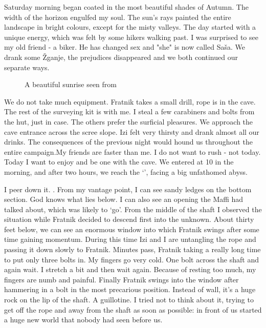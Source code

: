 Saturday morning began coated in the most beautiful shades of Autumn. The width of the horizon engulfed my soul. The sun's rays painted the entire landscape in bright colours, except for the misty valleys. The day started with a unique energy, which was felt by some hikers walking past. I was surprised to see my old friend - a biker. He has changed sex and "she" is now called Saša. We drank some Žganje, the prejudices disappeared and we  both continued our separate ways. 


 \begin{figure}[t!]
\checkoddpage \ifoddpage \forcerectofloat \else \forceversofloat \fi
\centering
{}
\caption{A beautiful sunrise seen from \protect{} }
\label{mig seen from kuk}
\end{figure}


We do not take much equipment. Fratnik takes a small drill, rope is in the cave. The rest of the surveying kit is with me. I steal a few carabiners and bolts from the hut, just in case. The others prefer the surficial pleasures. We approach the cave entrance across the scree slope. Izi felt very thirsty and drank almost all our drinks.  The consequences of the previous night would hound us throughout the entire campaign.My friends are faster than me. I do not want to rush  - not today. Today I want to enjoy and be one with the cave.  We entered  at 10 in the morning, and after two hours, we reach the `', facing a big unfathomed abyss.

 I peer down it. . From my vantage point, I can see sandy ledges on the bottom section. God knows what lies below. I can also see an opening the Maffi had talked about, which was likely to `go'. From the middle of the shaft I observed the situation while Fratnik decided to descend first into the unknown. About thirty feet below, we can see an enormous window into which Fratnik swings after some time gaining momentum. During this time Izi and I are untangling the rope and passing it down slowly to Fratnik. Minutes pass, Fratnik taking a really long time to put only three bolts in. My fingers go very cold. One bolt across the shaft and again wait. I stretch a bit and then wait again. Because of resting too much, my fingers are numb and painful. Finally Fratnik swings into the window after hammering in a bolt in the most precarious position. Instead of wall, it's a huge rock on the lip of the shaft. A guillotine.  I tried not to think about it, trying to get off the rope and away from the shaft as soon as possible: in front of us started a huge new world that nobody had seen before us. 

